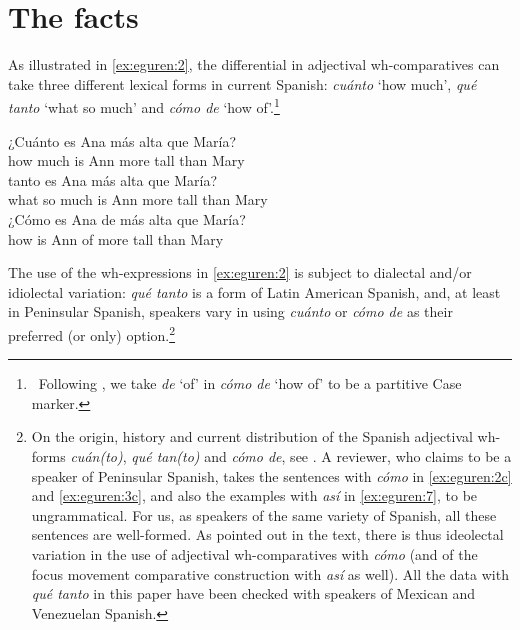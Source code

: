 \documentclass[output=paper,colorlinks,citecolor=brown]{langscibook}
\begin{document}
\section{The facts}
\label{sec:eguren:2}

As illustrated in \ref{ex:eguren:2}, the differential in adjectival wh-comparatives can take three different lexical forms in current Spanish: \textit{cuánto} `how much', \textit{qué tanto} `what so much' and \textit{cómo de} `how of'.\footnote{\
Following \cite{moron2004frase}, we take \textit{de} `of' in \textit{cómo de} `how of' to be a partitive Case marker.}

\begin{exe} %
    \ex\label{ex:eguren:2} %
    \begin{xlist} %
        \ex %
            \gll ¿Cuánto	es	Ana	más	alta	que	María?\\ 
            {how much}		is	Ann	more	tall	than	Mary\\    %
                 \ex
            	{tanto} es Ana más alta que	María?\\
            what 	{so much}	is	Ann	more tall than	Mary\\
            \ex\label{ex:eguren:2c}
            \gll¿Cómo	es	Ana	de	más	alta	que	María?\\
            how	is	Ann	of	more	tall	than	Mary\\
\end{xlist}
\end{exe}

\newpage

The use of the wh-expressions in \ref{ex:eguren:2} is subject to dialectal and/or idiolectal variation: \textit{qué tanto} is a form of Latin American Spanish, and, at least in Peninsular Spanish, speakers vary in using \textit{cuánto} or \textit{cómo de} as their preferred (or only) option.\footnote{On the origin, history and current distribution of the Spanish adjectival wh-forms \textit{cuán(to)}, \textit{qué tan(to)} and \textit{cómo de}, see \citet*{de2006cuantificadores}. A reviewer, who claims to be a speaker of Peninsular Spanish, takes the sentences with \textit{cómo} in \ref{ex:eguren:2c} and \ref{ex:eguren:3c}, and also the examples with \textit{así} in \ref{ex:eguren:7}, to be ungrammatical. For us, as speakers of the same variety of Spanish, all these sentences are well-formed. As pointed out in the text, there is thus ideolectal variation in the use of adjectival wh-comparatives with \textit{cómo} (and of the focus movement comparative construction with \textit{así} as well). All the data with \textit{qué tanto} in this paper have been checked with speakers of Mexican and Venezuelan Spanish.}
\end{document}
